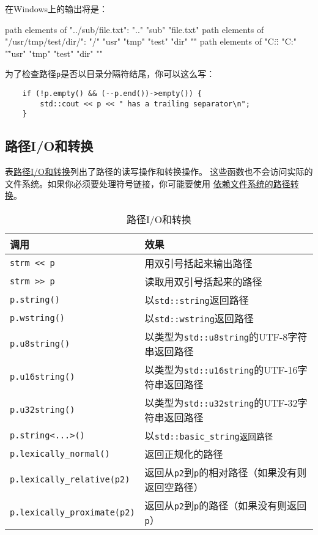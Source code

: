 在Windows上的输出将是：
\begin{blacklisting}
    path elements of "../sub/file.txt":
      ".."  "sub"  "file.txt"
    path elements of "/usr/tmp/test/dir/":
      "/"  "usr"  "tmp"  "test"  "dir"  ""
    path elements of "C:\usr\tmp\test\dir\":
      "C:"  "\"  "usr"  "tmp"  "test"  "dir"  ""
\end{blacklisting}
为了检查路径\texttt{p}是否以目录分隔符结尾，你可以这么写：
\begin{lstlisting}
    if (!p.empty() && (--p.end())->empty()) {
        std::cout << p << " has a trailing separator\n";
    }
\end{lstlisting}

\subsection{路径I/O和转换}\label{ch20.3.3}
表\hyperref[t20.5]{路径I/O和转换}列出了路径的读写操作和转换操作。
这些函数也不会访问实际的文件系统。如果你必须要处理符号链接，你可能要使用
\hyperref[ch20.4.5]{依赖文件系统的路径转换}。
\begin{table}[htb]
    \centering
    \begin{tabular}{l|l}
        \hline
        \textbf{调用}                         & \textbf{效果}                                     \\
        \hline
        \texttt{strm << p}                  & 用双引号括起来输出路径                                     \\
        \texttt{strm >> p}                  & 读取用双引号括起来的路径                                    \\
        \texttt{p.string()}                 & 以\texttt{std::string}返回路径                       \\
        \texttt{p.wstring()}                & 以\texttt{std::wstring}返回路径                      \\
        \texttt{p.u8string()}               & 以类型为\texttt{std::u8string}的UTF-8字符串返回路径         \\
        \texttt{p.u16string()}              & 以类型为\texttt{std::u16string}的UTF-16字符串返回路径       \\
        \texttt{p.u32string()}              & 以类型为\texttt{std::u32string}的UTF-32字符串返回路径       \\
        \texttt{p.string<...>()}            & 以\texttt{std::basic\_string返回路径}                \\
        \texttt{p.lexically\_normal()}      & 返回正规化的路径                                        \\
        \texttt{p.lexically\_relative(p2)}  & 返回从\texttt{p2}到\texttt{p}的相对路径（如果没有则返回空路径）      \\
        \texttt{p.lexically\_proximate(p2)} & 返回从\texttt{p2}到\texttt{p}的路径（如果没有则返回\texttt{p}） \\
        \hline
    \end{tabular}
    \caption{路径I/O和转换}
    \label{t20.5}
\end{table}

